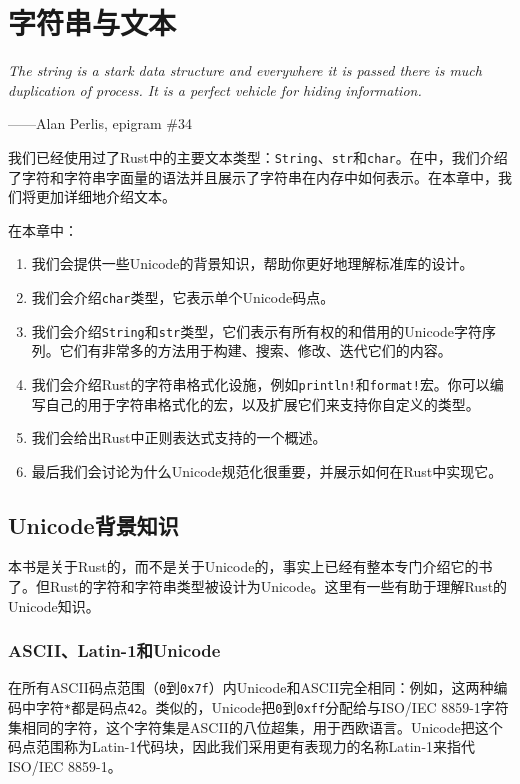 \chapter{字符串与文本}\label{ch17}

\emph{The string is a stark data structure and everywhere it is passed there is much duplication of process. It is a perfect vehicle for hiding information.}
\begin{flushright}
    ——Alan Perlis, epigram \#34
\end{flushright}

我们已经使用过了Rust中的主要文本类型：\texttt{String}、\texttt{str}和\texttt{char}。在中，我们介绍了字符和字符串字面量的语法并且展示了字符串在内存中如何表示。在本章中，我们将更加详细地介绍文本。

在本章中：
\begin{enumerate}
    \item 我们会提供一些Unicode的背景知识，帮助你更好地理解标准库的设计。
    \item 我们会介绍\texttt{char}类型，它表示单个Unicode码点。
    \item 我们会介绍\texttt{String}和\texttt{str}类型，它们表示有所有权的和借用的Unicode字符序列。它们有非常多的方法用于构建、搜索、修改、迭代它们的内容。
    \item 我们会介绍Rust的字符串格式化设施，例如\texttt{println!}和\texttt{format!}宏。你可以编写自己的用于字符串格式化的宏，以及扩展它们来支持你自定义的类型。
    \item 我们会给出Rust中正则表达式支持的一个概述。
    \item 最后我们会讨论为什么Unicode规范化很重要，并展示如何在Rust中实现它。
\end{enumerate}

\section{Unicode背景知识}

本书是关于Rust的，而不是关于Unicode的，事实上已经有整本专门介绍它的书了。但Rust的字符和字符串类型被设计为Unicode。这里有一些有助于理解Rust的Unicode知识。

\subsection{ASCII、Latin-1和Unicode}

在所有ASCII码点范围（\texttt{0}到\texttt{0x7f}）内Unicode和ASCII完全相同：例如，这两种编码中字符\texttt{*}都是码点\texttt{42}。类似的，Unicode把\texttt{0}到\texttt{0xff}分配给与ISO/IEC 8859-1字符集相同的字符，这个字符集是ASCII的八位超集，用于西欧语言。Unicode把这个码点范围称为Latin-1代码块，因此我们采用更有表现力的名称Latin-1来指代ISO/IEC 8859-1。


